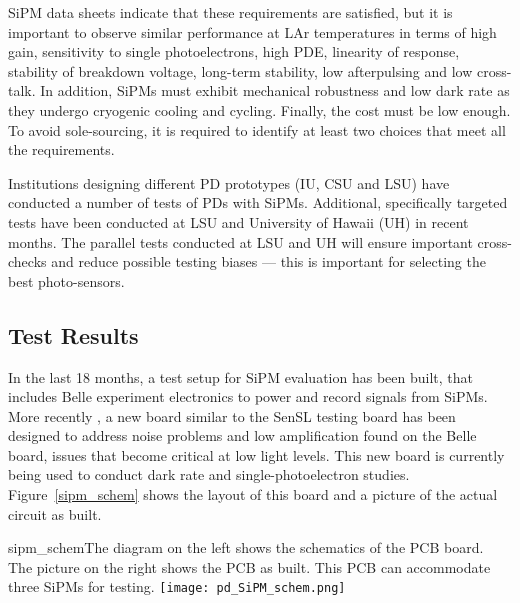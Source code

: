 
SiPM data sheets indicate that these requirements are satisfied, but
it is important to observe similar performance
at LAr temperatures in terms of high gain, sensitivity to
single photoelectrons, high PDE, linearity of response, stability
of breakdown voltage, long-term stability, low afterpulsing and low
cross-talk. In addition, SiPMs must exhibit mechanical
robustness and low dark rate as they undergo cryogenic cooling and cycling. Finally, the cost must be low enough. To avoid sole-sourcing, it is required
to identify at least two
choices that meet all the requirements. %

Institutions designing different PD prototypes (IU, CSU and LSU) %
have
conducted a number of tests of PDs with SiPMs.  Additional,
specifically targeted tests have been conducted at LSU and University of Hawaii (UH) in recent
months. %
The parallel tests conducted at LSU and
UH will ensure important cross-checks and reduce
possible testing biases --- this is important for selecting the best photo-sensors.

\subsection{Test Results}

In the last 18 months, a test setup for SiPM evaluation has been built,
that includes Belle experiment  electronics to power and record signals
from SiPMs.  More recently , a new board similar to the
SenSL testing board has been designed to address noise problems and low amplification
found on the Belle board, issues that become critical at low light levels. This new board is currently
being used to conduct dark rate and single-photoelectron studies.
Figure~\ref{sipm_schem} shows the layout of this board and a
picture of the actual circuit as built.

\begin{cdrfigure}{sipm_schem}{The diagram on the left shows the schematics
    of the PCB board. The picture  on the right shows the PCB as
    built. This PCB can accommodate three SiPMs for testing.}  
  \texttt{[image: pd\_SiPM\_schem.png]}
\end{cdrfigure}

